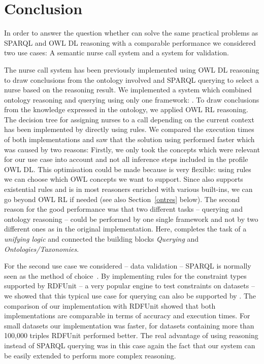 \section{Conclusion}
In order to answer the question whether \nthreelogic can solve the same practical problems as SPARQL and OWL DL reasoning with a comparable performance we considered two use cases:
A semantic nurse call system and a system for \rdf validation.  

The nurse call system has been previously implemented using OWL DL reasoning to draw conclusions from the ontology involved
and SPARQL querying to select a nurse based on the reasoning 
result. 
We implemented a system which combined ontology reasoning and querying using only one framework: \nthreelogic. To draw conclusions from 
the knowledge expressed in the ontology, we applied OWL RL reasoning. 
The decision tree
for assigning nurses to a call depending on the current context has been implemented by directly using \nthree rules. 
We compared the execution times of both implementations and saw that the solution using \nthree performed faster which was caused by two reasons:
Firstly, we only took the \owl concepts which were relevant for our use case into account and not all inference steps included in the profile OWL DL. 
This optimisation could be made because \nthreelogic is very flexible: using rules we can choose which OWL concepts we want to support. 
Since \nthree also supports existential rules and is in most reasoners enriched with various built-ins, we can go beyond OWL RL if needed 
(see also Section~\ref{ontres} below).
The second reason for the good performance was that two different tasks -- querying and ontology reasoning -- could be performed by one single framework and
not by two 
different ones as in the original implementation. Here, \nthree completes the task of a \emph{unifying logic} and connected the building blocks \emph{Querying} and 
\emph{Ontologies/Taxonomies}.

For the second use case  we considered -- \rdf data validation -- SPARQL is normally seen as the method of choice~\cite[p. 143]{hartmann2016}. By implementing 
rules for the constraint types supported by RDFUnit -- a very popular engine to test constraints on \rdf datasets -- 
we showed that this typical use case for querying 
can also be supported by \nthreelogic. The comparison of our implementation with RDFUnit showed that both implementations are comparable in terms of accuracy and 
execution times. For small datasets our implementation was faster, for datasets containing more than 100,000 triples RDFUnit performed better.
The real advantage of using \nthree reasoning instead of SPARQL querying was in this case again the fact that our system can be easily extended to perform more complex 
reasoning.

